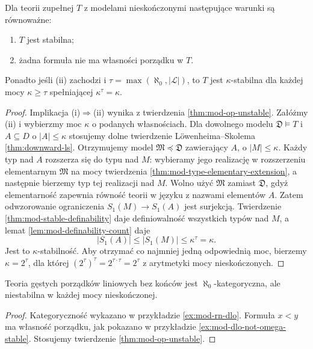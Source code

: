 \begin{twierdzenie}
\label{thm:mod-stability-iff-no-op}
Dla teorii zupełnej $T$ z modelami nieskończonymi
następujące warunki są równoważne:
\begin{enumerate}[label=(\roman*)]
\item $T$ jest stabilna;
\item żadna formuła nie ma własności porządku w $T$.
\end{enumerate}
Ponadto jeśli (ii) zachodzi i
$\tau=\max(\aleph_0,|\mathcal L|)$, to $T$
jest $\kappa$-stabilna dla każdej mocy
$\kappa\geq\tau$ spełniającej $\kappa^\tau=\kappa$.
\end{twierdzenie}
\begin{proof}
Implikacja (i)$\Rightarrow$(ii) wynika z
twierdzenia \ref{thm:mod-op-unstable}.
Załóżmy (ii) i wybierzmy moc $\kappa$
o podanych własnościach.
Dla dowolnego modelu $\mathfrak D\models T$
i $A\subseteq D$ o $|A|\leq\kappa$ stosujemy
dolne twierdzenie Löwenheima--Skolema
\ref{thm:downward-ls}. Otrzymujemy model
$\mathfrak M\preccurlyeq\mathfrak D$
zawierający $A$, o $|M|\leq\kappa$.
Każdy typ nad $A$ rozszerza się do typu
nad $M$: wybieramy jego realizację
w rozszerzeniu elementarnym $\mathfrak M$
na mocy twierdzenia
\ref{thm:mod-type-elementary-extension},
a następnie bierzemy typ tej realizacji nad $M$.
Wolno użyć $\mathfrak M$ zamiast $\mathfrak D$,
gdyż elementarność zapewnia równość teorii
w języku z nazwami elementów $A$.
Zatem odwzorowanie ograniczenia
$S_1(M)\to S_1(A)$ jest surjekcją.
Twierdzenie \ref{thm:mod-stable-definability}
daje definiowalność wszystkich typów nad $M$,
a lemat \ref{lem:mod-definability-count} daje
\[
|S_1(A)|\leq |S_1(M)|\leq\kappa^\tau=\kappa.
\]
Jest to $\kappa$-stabilność. Aby otrzymać
co najmniej jedną odpowiednią moc, bierzemy
$\kappa=2^\tau$, dla której
$(2^\tau)^\tau=2^{\tau\cdot\tau}=2^\tau$
z arytmetyki mocy nieskończonych.
\end{proof}

\begin{wniosek}
\label{cor:mod-dlo-unstable}
Teoria gęstych porządków liniowych bez końców
jest $\aleph_0$-kategoryczna, ale niestabilna
w każdej mocy nieskończonej.
\end{wniosek}
\begin{proof}
Kategoryczność wykazano w przykładzie
\ref{ex:mod-rn-dlo}. Formuła $x<y$ ma własność
porządku, jak pokazano w przykładzie
\ref{ex:mod-dlo-not-omega-stable}.
Stosujemy twierdzenie \ref{thm:mod-op-unstable}.
\end{proof}

